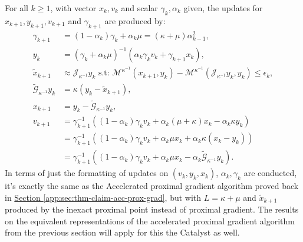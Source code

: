 \documentclass[12pt]{article}
\begin{document}
        \begin{remark}
            For all $k \ge 1$, with vector $x_k, v_k$ and scalar $\gamma_k, \alpha_k$ given, the updates for $x_{k + 1}, y_{k + 1}, v_{k + 1}$ and $\gamma_{k + 1}$ are produced by: 
            \begin{align*}
                \gamma_{k + 1} &= (1 - \alpha_{k})\gamma_k + \alpha_k \mu = (\kappa + \mu)\alpha_{k - 1}^2,
                \\
                y_k &= (\gamma_k + \alpha_k \mu)^{-1}
                (\alpha_k \gamma_k v_k + \gamma_{k + 1}x_k),
                \\
                \tilde x_{k + 1} &\approx \mathcal J_{\kappa^{-1}} y_{k} 
                \text{ s.t: } 
                \mathcal M^{\kappa^{-1}}(x_{k + 1}, y_k) - 
                \mathcal M^{\kappa^{-1}}(\mathcal J_{\kappa^{-1}} y_{k} , y_k) \le \epsilon_k,
                \\
                \widetilde{\mathcal G}_{\kappa^{-1}} y_k &= \kappa(y_k - \tilde x_{k + 1}),
                \\
                x_{k + 1} &= y_k - \widetilde{\mathcal G}_{\kappa^{-1}} y_k,
                \\
                v_{k + 1} &= 
                \gamma_{k + 1}^{-1}\left(
                    (1 - \alpha_k)\gamma_k v_k + 
                    \alpha_k(\mu + \kappa)x_k 
                    - \alpha_k \kappa y_k
                \right)
                \\
                &= \gamma_{k + 1}^{-1}(
                    (1 - \alpha_k)\gamma_k v_k + \alpha_k\mu x_k + 
                    \alpha_k\kappa(x_k - y_k)
                )
                \\
                &= 
                \gamma_{k + 1}^{-1}\left(
                    (1 - \alpha_k)\gamma_k v_k + \alpha_k\mu x_k - \alpha_k 
                    \widetilde{\mathcal G}_{\kappa^{-1}}y_k
                \right). 
            \end{align*}
            In terms of just the formatting of updates on $(v_k, y_k, x_k)$, $\alpha_k, \gamma_k$ are conducted, it's exactly the same as the Accelerated proximal gradient algorithm proved back in 
            \hyperref[app:sec:thm-claim-acc-prox-grad]{Section \ref*{app:sec:thm-claim-acc-prox-grad}}, but with $L = \kappa + \mu$ and $\tilde x_{k + 1}$ produced by the inexact proximal point instead of proximal gradient. 
            The results on the equivalent representations of the accelerated proximal gradient algorithm from the previous section will apply for this the Catalyst as well. 

\end{remark}
\end{document}
